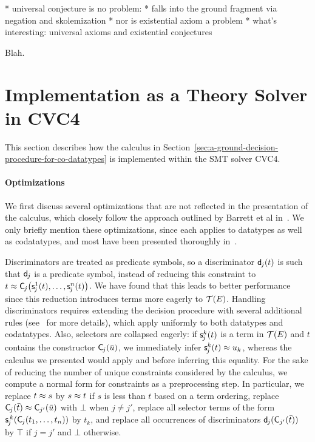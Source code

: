   * universal conjecture is no problem:
    * falls into the ground fragment via negation
      and skolemization
  * nor is existential axiom a problem
  * what's interesting: universal axioms and existential conjectures

Blah.

\section{Implementation as a Theory Solver in CVC4}
\label{sec:the-theory-solver}

This section describes how the calculus in Section~\ref{sec:a-ground-decision-procedure-for-co-datatypes} is implemented within the SMT solver CVC4.

\paragraph{Optimizations}
We first discuss several optimizations that are not reflected in the presentation of the calculus, which closely follow the approach outlined by Barrett et al in~\cite{}.
We only briefly mention these optimizations, since each applies to datatypes as well as codatatypes, and most have been presented thoroughly in~\cite{}.

Discriminators are treated as predicate symbols, so a discriminator $\textsf{d}_{\kern-0.083333em j}( t )$ is such that $\textsf{d}_{\kern-0.083333em j}$
is a predicate symbol, instead of reducing this constraint to $t \approx \textsf{C}_{\kern-0.083333em j}\bigl( \textsf{s}^1_{\kern-0.083333em j}( t ), \ldots, \textsf{s}^n_{\kern-0.083333em j}( t ) \bigr)$.
We have found that this leads to better performance since this reduction introduces terms more eagerly to $\mathcal{T}(E)$.
Handling discriminators requires extending the decision procedure with several additional rules (see~\cite{} for more details), which apply uniformly to both datatypes and codatatypes.
Also, selectors are collapsed eagerly:
if $\textsf{s}^k_{\kern-0.083333em j}( t )$ is a term in $\mathcal{T}(E)$ and $t$ contains the constructor
$\textsf{C}_{\kern-0.083333em j}( \bar u )$, we immediately infer $\textsf{s}^k_{\kern-0.083333em j}( t ) \approx u_k$, whereas the calculus we presented would apply  and  before inferring this equality.
For the sake of reducing the number of unique constraints considered by the calculus, we compute a normal form for constraints as a preprocessing step.
In particular, we
replace $t \approx s$ by $s \approx t$ if $s$ is less than $t$ based on a term ordering,
replace $\textsf{C}_{\kern-0.083333em j}( \bar t ) \approx \textsf{C}_{j'}( \bar u )$ with $\bot$ when $j \neq j'$,
replace all selector terms of the form $\textsf{s}^{\,k}_{\kern-0.083333em j}( \textsf{C}_{\kern-0.083333em j}(t_1,\ldots,t_n) )$ by $t_k$,
and replace all occurrences of discriminators $\textsf{d}_{\kern-0.083333em j}( \textsf{C}_{j'}( \bar t ) )$ by $\top$ if $j=j'$ and $\bot$ otherwise.

